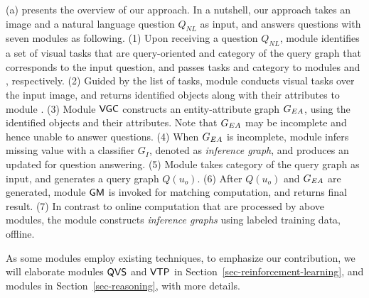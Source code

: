 


 (a) presents the overview of our approach. In a nutshell, our approach takes an image and a natural language question $Q_{NL}$ as input, and answers questions with seven modules as following. (1) Upon receiving a question $Q_{NL}$, module  identifies a set of visual tasks that are query-oriented and category of the query graph that corresponds to the input question, and passes tasks and category to modules  and , respectively. (2) Guided by the list of tasks, module  conducts visual tasks over the input image, and returns identified objects along with their attributes to module . (3) Module ${\mathsf{VGC}}$ constructs an entity-attribute graph $G_{EA}$, using the identified objects and their attributes. Note that $G_{EA}$ may be incomplete and hence unable to answer questions. (4) When $G_{EA}$ is incomplete, module  infers missing value with a classifier $G_I$, denoted as {\em inference graph}, and produces an updated  for question answering. (5) Module  takes category of the query graph as input, and generates a query graph $Q(u_o)$. (6) After $Q(u_o)$ and $G_{EA}$ are generated, module ${\mathsf{GM}}$ is invoked for matching computation, and returns final result. (7) In contrast to online computation that are processed by above modules, the module  constructs {\em inference graphs} using labeled training data, offline. 

As some modules employ existing techniques, to emphasize our contribution, we will elaborate modules ${\mathsf{QVS}}$ and ${\mathsf{VTP}}$ in Section~\ref{sec-reinforcement-learning}, and modules  in Section~\ref{sec-reasoning}, with more details. 